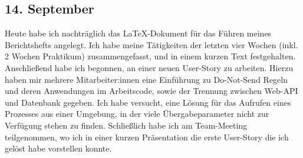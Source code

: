 \subsection{14. September}
Heute habe ich nachträglich das \LaTeX -Dokument für das Führen meines Berichtshefts angelegt. Ich habe meine Tätigkeiten der letzten vier Wochen (inkl. 2 Wochen Praktikum) zusammengefasst, und in einem kurzen Text festgehalten. Anschließend habe ich begonnen, an einer neuen User-Story zu arbeiten. Hierzu haben mir mehrere Mitarbeiter:innen  eine Einführung zu Do-Not-Send Regeln und deren Anwendungen im Arbeitscode, sowie der Trennung zwischen Web-API und Datenbank gegeben. Ich habe versucht, eine Lösung für das Aufrufen eines Prozesses aus einer Umgebung, in der viele Übergabeparameter nicht zur Verfügung stehen zu finden. 
Schließlich habe ich am Team-Meeting teilgenommen, wo ich in einer kurzen Präsentation die erste User-Story die ich gelöst habe vorstellen konnte.
